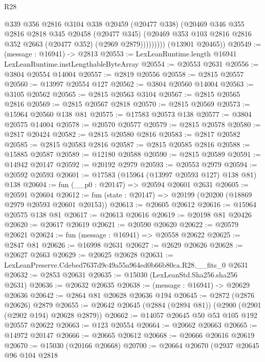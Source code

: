 \begin{lexlean}{R28}
\begin{coremodule}
                  @339
                  @356
                  @2816
                  @3104
                  @338
                  @20459
                  (@20477 @338)
                  (@20469
                    @346
                    @355
                    @2816
                    @2818
                    @345
                    @20458
                    (@20477 @345)
                    (@20469 @353 @103 @2816 @2816 @352 @2663 (@20477 @352) (@2969 @2879)))))))))
      (@13901 @20465))
@20549 := (message : @16941) -> @2813
@20553 := LexLeanRuntime.length @16941 LexLeanRuntime.instLengthableByteArray
@20554 := @20553 @2631
@20556 := @3804 @20554 @14004
@20557 := @2819 @20556
@20558 := @2815 @20557
@20560 := @13997 @20554 @127
@20562 := @3804 @20560 @14004
@20563 := @3105 @20562
@20565 := @2815 @20563 @3104
@20567 := @2815 @20565 @2816
@20569 := @2815 @20567 @2818
@20570 := @2815 @20569
@20573 := @15964 @20560 @138 @81
@20575 := @17583 @20573 @138
@20577 := @3804 @20575 @14004
@20578 := @20570 @20577
@20579 := @2815 @20578
@20580 := @2817 @20424
@20582 := @2815 @20580 @2816
@20583 := @2817 @20582
@20585 := @2815 @20583 @2816
@20587 := @2815 @20585 @2816
@20588 := @15885 @20587
@20589 := @12180 @20588
@20590 := @2815 @20589
@20591 := @14942 @20147
@20592 := @20192 @2979
@20593 := @20553 @2979
@20594 := @20592 @20593
@20601 := @17583 (@15964 (@13997 @20593 @127) @138 @81) @138
@20604 := fun (__p0 : @20147) => @20594 @20601 @2631
@20605 := @20591 @20604
@20612 := fun (state : @20147) => @20199 (@20200 (@18869 @2979 @20593 @20601 @20153))
@20613 := @20605 @20612
@20616 := @15964 @20575 @138 @81
@20617 := @20613 @20616
@20619 := @20198 @81 @20426
@20620 := @20617 @20619
@20621 := @20590 @20620
@20622 := @20579 @20621
@20624 := fun (message : @16941) => @20558 @20622
@20625 := @2847 @81
@20626 := @16998 @2631
@20627 := @2629 @20626
@20628 := @20627 @2663
@20629 := @20625 @20628
@20631 := LexLeanPreserve.Cdebed7637d9c49a55a964ed0b66b80ca.R28.__fits_0 @2631
@20632 := @2853 @20631
@20635 := @15030 (LexLeanStd.Sha256.sha256 @2631)
@20636 := @20632 @20635
@20638 := (message : @16941) -> @20629 @20636
@20642 := @2864 @81 @20628 @20636 @194
@20645 := @2872 (@2876 @20626) @2879
@20655 := @20642 @20645 (@2884 (@2894 @81)) (@2900 (@2901 (@2902 @194) @20628 @2879))
@20662 := @14057 @20645 @50 @53 @105 @192 @20557 @20622
@20663 := @123 @20554
@20664 := @20662 @20663
@20665 := @14972 @20147
@20666 := @20665 @20612
@20668 := @20666 @20616 @20619
@20670 := @15030 (@20166 @20668)
@20700 := @20664
    @20670
    (@2937
      @20645
      @96
      @104
      @2818

\end{coremodule}
\end{lexlean}
